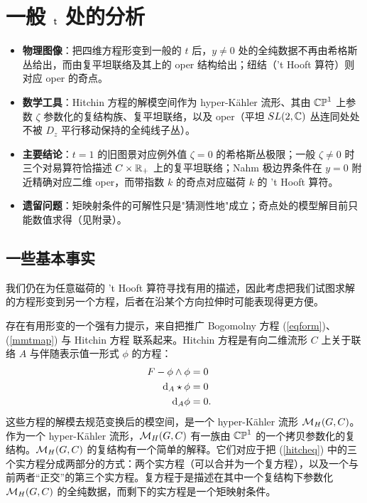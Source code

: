 \section{一般 $\t$ 处的分析}\label{analog}

\begin{keytakeaways}
\begin{itemize}\setlength{\itemsep}{2pt}
  \item \textbf{物理图像}：把四维方程形变到一般的 $t$ 后，$y\ne0$ 处的全纯数据不再由希格斯丛给出，而由复平坦联络及其上的 oper 结构给出；纽结（'t Hooft 算符）则对应 oper 的奇点。
  \item \textbf{数学工具}：Hitchin 方程的解模空间作为 hyper-Kähler 流形、其由 $\CP^1$ 上参数 $\zeta$ 参数化的复结构族、复平坦联络，以及 oper（平坦 $SL(2,\C)$ 丛连同处处不被 $D_z$ 平行移动保持的全纯线子丛）。
  \item \textbf{主要结论}：$t=1$ 的旧图景对应例外值 $\zeta=0$ 的希格斯丛极限；一般 $\zeta\ne0$ 时三个对易算符恰描述 $C\times\R_+$ 上的复平坦联络；Nahm 极边界条件在 $y=0$ 附近精确对应二维 oper，而带指数 $k$ 的奇点对应磁荷 $k$ 的 't Hooft 算符。
  \item \textbf{遗留问题}：矩映射条件的可解性只是"猜测性地"成立；奇点处的模型解目前只能数值求得（见附录）。
\end{itemize}
\end{keytakeaways}

\subsection{一些基本事实}\label{motivation}

我们仍在为任意磁荷的 't Hooft 算符寻找有用的描述，因此考虑把我们试图求解的方程形变到另一个方程，后者在沿某个方向拉伸时可能表现得更方便。

存在有用形变的一个强有力提示，来自把推广 Bogomolny 方程 (\ref{eqform})、(\ref{mmtmap}) 与 Hitchin 方程 \cite{Hitchin} 联系起来。Hitchin 方程是有向二维流形 $C$ 上关于联络 $A$ 与伴随表示值一形式 $\phi$ 的方程：
\begin{align}\label{hitcheq} F-\phi\wedge\phi & = 0 \cr \d_A\star\phi& = 0 \cr
\d_A\phi&=0.\end{align}
这些方程的解模去规范变换后的模空间，是一个 hyper-Kähler 流形 $\M_H(G,C)$。作为一个 hyper-Kähler 流形，$\M_H(G,C)$ 有一族由 $\Bbb{CP}^1$ 的一个拷贝参数化的复结构。$\M_H(G,C)$ 的复结构有一个简单的解释。它们对应于把 (\ref{hitcheq}) 中的三个实方程分成两部分的方式：两个实方程（可以合并为一个复方程），以及一个与前两者“正交”的第三个实方程。复方程于是描述在其中一个复结构下参数化 $\M_H(G,C)$ 的全纯数据，而剩下的实方程是一个矩映射条件。

